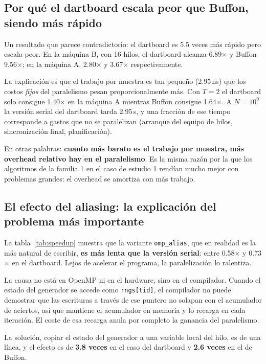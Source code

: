 \subsection{Por qué el dartboard escala peor que Buffon, siendo más rápido}

Un resultado que parece contradictorio: el dartboard es 5.5 veces más rápido pero escala peor. En la máquina B, con 16 hilos, el dartboard alcanza 6.89$\times$ y Buffon 9.56$\times$; en la máquina A, 2.80$\times$ y 3.67$\times$ respectivamente.

La explicación es que el trabajo por muestra es tan pequeño (2.95\,ns) que los costos \emph{fijos} del paralelismo pesan proporcionalmente más. Con $T = 2$ el dartboard solo consigue 1.40$\times$ en la máquina A mientras Buffon consigue 1.64$\times$. A $N = 10^9$ la versión serial del dartboard tarda 2.95\,s, y una fracción de ese tiempo corresponde a gastos que no se paralelizan (arranque del equipo de hilos, sincronización final, planificación).

En otras palabras: \textbf{cuanto más barato es el trabajo por muestra, más overhead relativo hay en el paralelismo}. Es la misma razón por la que los algoritmos de la familia 1 en el caso de estudio 1 rendían mucho mejor con problemas grandes: el overhead se amortiza con más trabajo.

\subsection{El efecto del aliasing: la explicación del problema más importante}

La tabla~\ref{tab:speedup} muestra que la variante \texttt{omp\_alias}, que en realidad es la más natural de escribir, \textbf{es más lenta que la versión serial}: entre 0.58$\times$ y 0.73$\times$ en el dartboard. Lejos de acelerar el programa, la paralelización lo ralentiza.

La causa no está en OpenMP ni en el hardware, sino en el compilador. Cuando el estado del generador se accede como \texttt{rngs[tid]}, el compilador no puede demostrar que las escrituras a través de ese puntero no solapan con el acumulador de aciertos, así que mantiene el acumulador en memoria y lo recarga en cada iteración. El coste de esa recarga anula por completo la ganancia del paralelismo.

La solución, copiar el estado del generador a una variable local del hilo, es de una línea, y el efecto es de \textbf{3.8 veces} en el caso del dartboard y \textbf{2.6 veces} en el de Buffon.

